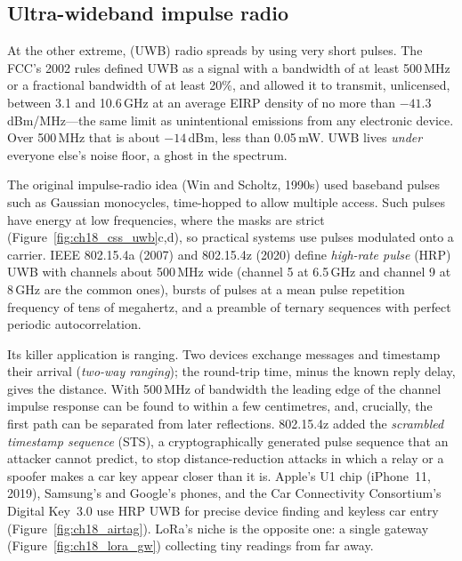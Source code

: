 \subsection{Ultra-wideband impulse radio}

At the other extreme,  (UWB) radio spreads by using very short pulses.
The FCC's 2002 rules defined UWB as a signal with a bandwidth of at least 500\,MHz or a
fractional bandwidth of at least 20\%, and allowed it to transmit, unlicensed, between 3.1
and 10.6\,GHz at an average EIRP density of no more than $-41.3$\,dBm/MHz---the same limit as
unintentional emissions from any electronic device. Over 500\,MHz that is about $-14$\,dBm,
less than 0.05\,mW. UWB lives \emph{under} everyone else's noise floor, a ghost in the spectrum.


The original impulse-radio idea (Win and Scholtz, 1990s) used baseband pulses such as
Gaussian monocycles, time-hopped to allow multiple access. Such pulses have energy at low
frequencies, where the masks are strict (Figure~\ref{fig:ch18_css_uwb}c,d), so practical
systems use pulses modulated onto a carrier. IEEE 802.15.4a (2007) and 802.15.4z (2020)
define \emph{high-rate pulse} (HRP) UWB with channels about 500\,MHz wide (channel 5 at
6.5\,GHz and channel 9 at 8\,GHz are the common ones), bursts of pulses at a mean pulse
repetition frequency of tens of megahertz, and a preamble of ternary sequences with perfect
periodic autocorrelation.

Its killer application is ranging. Two devices exchange messages and timestamp their
arrival (\emph{two-way ranging}); the round-trip time, minus the known reply delay, gives the
distance. With 500\,MHz of bandwidth the leading edge of the channel impulse response can be
found to within a few centimetres, and, crucially, the first path can be separated from later
reflections. 802.15.4z added the \emph{scrambled timestamp sequence} (STS), a
cryptographically generated pulse sequence that an attacker cannot predict, to stop
distance-reduction attacks in which a relay or a spoofer makes a car key appear closer than
it is. Apple's U1 chip (iPhone~11, 2019), Samsung's and Google's phones, and the Car
Connectivity Consortium's Digital Key~3.0 use HRP UWB for precise device finding and
keyless car entry (Figure~\ref{fig:ch18_airtag}). LoRa's niche is the opposite one: a single
gateway (Figure~\ref{fig:ch18_lora_gw}) collecting tiny readings from far away.

